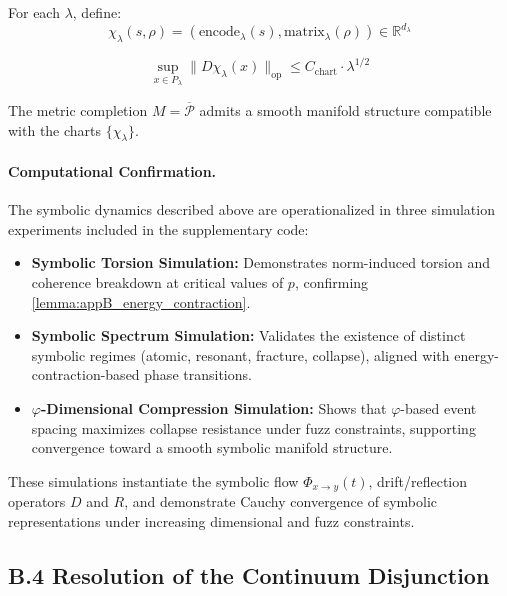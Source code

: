\begin{definition}
\label{definition:appB_symbolic_chart}
For each $\lambda$, define:
\[
\chi_\lambda(s, \rho) = (\text{encode}_\lambda(s), \text{matrix}_\lambda(\rho)) \in \mathbb{R}^{d_\lambda}
\]
\end{definition}

\begin{lemma}
\label{lemma:appB_chart_bounds}
\[
\sup_{x \in P_\lambda} \|D\chi_\lambda(x)\|_{\text{op}} \leq C_{\text{chart}} \cdot \lambda^{1/2}
\]
\end{lemma}

\begin{theorem}
\label{theorem:appB_smooth_atlas}
The metric completion $M = \overline{\mathcal{P}}$ admits a smooth manifold structure compatible with the charts $\{\chi_\lambda\}$.
\end{theorem}

\paragraph{Computational Confirmation.}
The symbolic dynamics described above are operationalized in three simulation experiments included in the supplementary code:
\begin{itemize}
  \item \textbf{Symbolic Torsion Simulation:} Demonstrates norm-induced torsion and coherence breakdown at critical values of \( p \), confirming \autoref{lemma:appB_energy_contraction}.
  \item \textbf{Symbolic Spectrum Simulation:} Validates the existence of distinct symbolic regimes (atomic, resonant, fracture, collapse), aligned with energy-contraction-based phase transitions.
  \item \textbf{$\varphi$-Dimensional Compression Simulation:} Shows that $\varphi$-based event spacing maximizes collapse resistance under fuzz constraints, supporting convergence toward a smooth symbolic manifold structure.
\end{itemize}
These simulations instantiate the symbolic flow \( \Phi_{x \to y}(t) \), drift/reflection operators \( D \) and \( R \), and demonstrate Cauchy convergence of symbolic representations under increasing dimensional and fuzz constraints.

\subsection*{B.4 Resolution of the Continuum Disjunction}
\label{subsec:appB_continuum_resolution}

